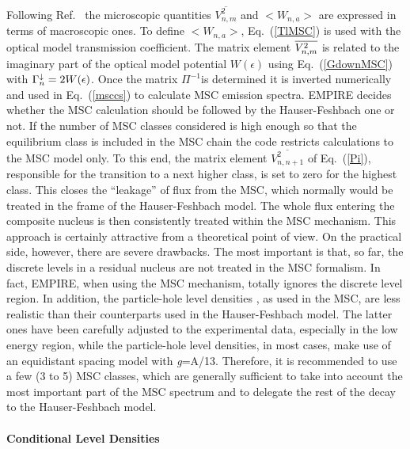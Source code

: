 Following Ref.~\cite{HRW} the microscopic quantities $%
\overline{V_{n,m}^{2}}$ and $<W_{n,a}>$ are expressed in terms of
macroscopic ones. To define $<W_{n,a}>$, Eq.~(\ref{TlMSC}) is used with the
optical model transmission coefficient. The matrix element $\overline{%
V_{n,m}^{2}}$ is related to the imaginary part of the optical model
potential $W(\epsilon)$ using Eq.~(\ref{GdownMSC}) with $\Gamma_{n}^{%
\downarrow}=2W(\epsilon)$. Once the matrix $\Pi^{-1}$is determined it is
inverted numerically and used in Eq.~(\ref{msccs}) to calculate MSC%
 emission spectra. EMPIRE decides whether the MSC calculation
should be followed by the Hauser-Feshbach%
 one or not. If the number of MSC classes considered
is high enough so that the equilibrium class is included in the MSC chain
the code restricts calculations to the MSC model only. To this end, the
matrix element $%
\overline{V_{n,n+1}^{2}}$ of Eq.~(\ref{Pi}), responsible for the transition to
a next higher class, is set to zero for the highest class. This closes the
{}``leakage'' of flux from the MSC, which normally would be treated in the
frame of the Hauser-Feshbach%
 model. The whole flux entering the composite
nucleus is then consistently treated within the MSC mechanism. This approach is
certainly attractive from a theoretical point of view. On the practical
side, however, there are severe drawbacks. The most important is that, so
far, the discrete levels in a residual nucleus are not treated in the MSC%
 formalism. In fact, EMPIRE, when using the MSC mechanism, totally
ignores the discrete level region. In addition, the particle-hole level
densities%
, as used in the MSC, are less realistic than their
counterparts used in the Hauser-Feshbach%
 model. The latter ones have been carefully adjusted
to the experimental data, especially in the low energy region, while the
particle-hole level densities, in most cases, make use of an equidistant
spacing model with \emph{g}=A/13. Therefore, it is recommended to use a few
(3 to 5) MSC%
 classes, which are generally sufficient to take into
account the most
important part of the MSC spectrum and to delegate the rest of the decay to
the Hauser-Feshbach model.

\medskip

\paragraph{Conditional Level Densities}

